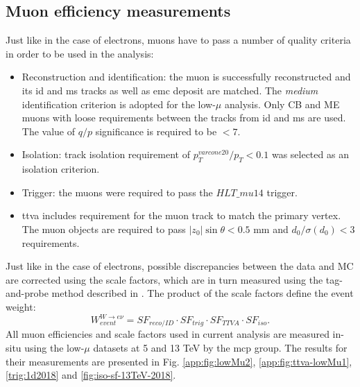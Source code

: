     \subsection{Muon efficiency measurements}
    Just like in the case of electrons, muons have to pass a number of quality criteria in order to be used in the analysis:
    \begin{itemize}
    	\item Reconstruction and identification: the muon is successfully reconstructed and its \gls{id} and \gls{ms} tracks as well as \gls{emc} deposit are matched. The \textit{medium} identification criterion is adopted for the low-$\mu$ analysis. Only CB and ME muons with loose requirements between the tracks from \gls{id} and \gls{ms} are used. The value of $q/p$ significance is required to be $<7$. 
    	\item Isolation: track isolation requirement of $p_T^{varcone20}/p_T<0.1$ was selected as an isolation criterion. 
    	\item Trigger: the muons were required to pass the $HLT\_mu14$ trigger.
    	\item \gls{ttva} includes requirement for the muon track to match the primary vertex. The muon objects are required to pass $|z_0|\sin{\theta}<0.5$ mm and $d_0/\sigma(d_0)<3$ requirements.
    \end{itemize}
	Just like in the case of electrons, possible discrepancies between the data and MC are corrected using the scale factors, which are in turn measured using the tag-and-probe method described in \cite{Koehler:2665704}. The product of the scale factors define the event weight: 
	\begin{equation*}
	W_{event}^{W\rightarrow e\nu}=SF_{reco/ID} \cdot SF_{trig} \cdot SF_{TTVA} \cdot SF_{iso}.
	\end{equation*}
	All muon efficiencies and scale factors used in current analysis are measured in-situ using the low-$\mu$ datasets at 5 and 13 TeV by the \gls{mcp} group. The results for their measurements are presented in Fig. \ref{app:fig:lowMu2}, \ref{app:fig:ttva-lowMu1}, \ref{trig:1d2018} and \ref{fig:iso-sf-13TeV-2018}.
	
